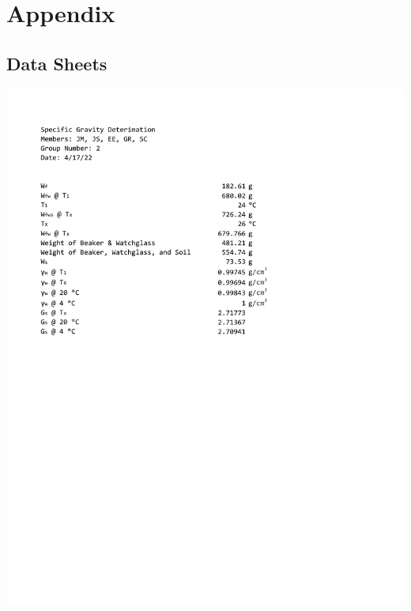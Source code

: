 \documentclass{article}
\begin{document}
\section{Appendix} 
\subsection{Data Sheets}
\begin{center}
\includegraphics*[scale=0.7]{ds1.pdf}
\newpage

\end{center}
\end{document}
